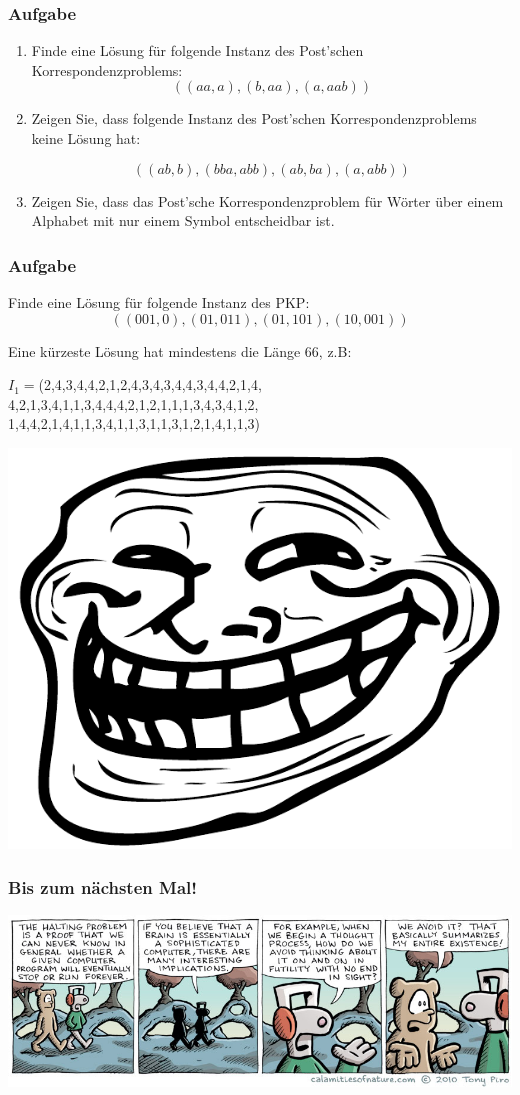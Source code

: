 \begin{frame}
\frametitle{Aufgabe}
\begin{enumerate}
\item Finde eine Lösung für folgende Instanz des Post'schen Korrespondenzproblems: 
\[ ((aa, a), (b, aa), (a, aab)) \]
  \item Zeigen Sie, dass folgende Instanz des Post'schen Korrespondenzproblems
        keine Lösung hat:

        \[ ((ab, b), (bba, abb), (ab, ba), (a, abb)) \]

  \item Zeigen Sie, dass das Post'sche Korrespondenzproblem für Wörter
über einem Alphabet mit nur einem Symbol entscheidbar ist.
\end{enumerate}
\end{frame}

\begin{frame}
\frametitle{Aufgabe}
Finde eine Lösung für folgende Instanz des PKP:
$$ ((001,0),(01,011),(01,101),(10,001)) $$

\pause

Eine kürzeste Lösung hat mindestens die Länge 66, z.B:
\begin{center}
$ I_1 = $(2,4,3,4,4,2,1,2,4,3,4,3,4,4,3,4,4,2,1,4,\\
4,2,1,3,4,1,1,3,4,4,4,2,1,2,1,1,1,3,4,3,4,1,2,\\
1,4,4,2,1,4,1,1,3,4,1,1,3,1,1,3,1,2,1,4,1,1,3)
\end{center}

\pause

\includegraphics{images/trollface}

\end{frame}

\begin{frame}
	\frametitle{Bis zum nächsten Mal!}
    \begin{center}
        \includegraphics[width=\textwidth]{images/halting.jpg}
    \end{center}
\end{frame}


